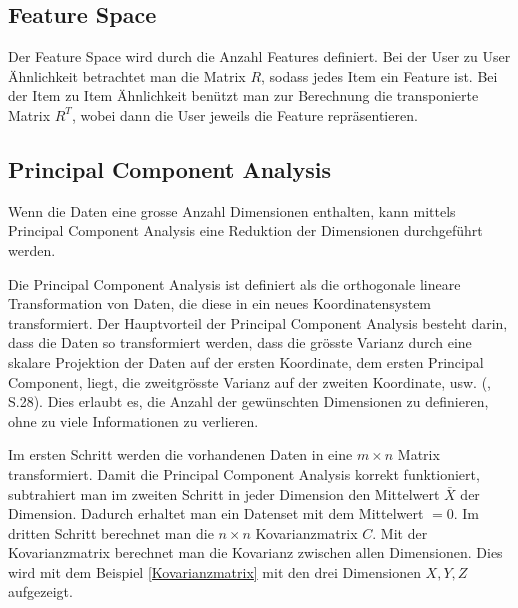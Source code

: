 \subsection{Feature Space}
Der Feature Space wird durch die Anzahl Features definiert.
Bei der User zu User Ähnlichkeit betrachtet man die Matrix $R$, sodass jedes Item ein Feature ist. Bei der Item zu Item Ähnlichkeit benützt man zur Berechnung die transponierte Matrix $R^T$, wobei dann die User jeweils die Feature repräsentieren.


\subsection{Principal Component Analysis}
Wenn die Daten eine grosse Anzahl Dimensionen enthalten, kann mittels Principal Component Analysis eine Reduktion der Dimensionen durchgeführt werden.

Die Principal Component Analysis ist definiert als die orthogonale lineare Transformation von Daten, die diese in ein neues Koordinatensystem transformiert. Der Hauptvorteil der Principal Component Analysis besteht darin, dass die Daten so transformiert werden, dass die grösste Varianz durch eine skalare Projektion der Daten auf der ersten Koordinate, dem ersten Principal Component, liegt, die zweitgrösste Varianz auf der zweiten Koordinate, usw. (\cite{jolliffe_principal_2002}, S.28). Dies erlaubt es, die Anzahl der gewünschten Dimensionen zu definieren, ohne zu viele Informationen zu verlieren.


Im ersten Schritt werden die vorhandenen Daten in eine $m\times n$ Matrix transformiert. Damit die Principal Component Analysis korrekt funktioniert, subtrahiert man im zweiten Schritt in jeder Dimension den Mittelwert $\bar{X}$ der Dimension. Dadurch erhaltet man ein Datenset mit dem Mittelwert $= 0$.
Im dritten Schritt berechnet man die $n\times n$ Kovarianzmatrix $C$. Mit der Kovarianzmatrix berechnet man die Kovarianz zwischen allen Dimensionen. Dies wird mit dem Beispiel \eqref{Kovarianzmatrix} mit den drei Dimensionen $X,Y,Z$ aufgezeigt.


